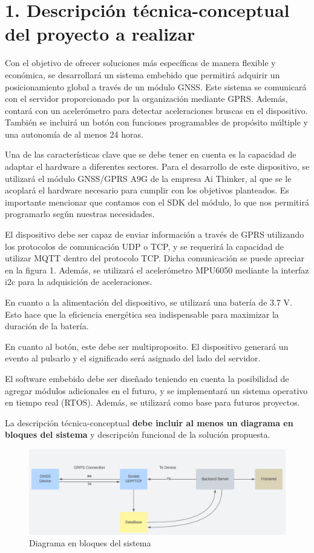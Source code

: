 \documentclass[
11pt, %
codirector, %
]{charter}
\begin{document}
\section{1. Descripción técnica-conceptual del proyecto a realizar}
\label{sec:descripcion}


Con el objetivo de ofrecer soluciones más específicas de manera flexible y económica, se desarrollará un sistema embebido que permitirá adquirir un posicionamiento global a través de un módulo GNSS. Este sistema se comunicará con el servidor proporcionado por la organización mediante GPRS. Además, contará con un acelerómetro para detectar aceleraciones bruscas en el dispositivo. También se incluirá un botón con funciones programables de propósito múltiple y una autonomía de al menos 24 horas.

Una de las características clave que se debe tener en cuenta es la capacidad de adaptar el hardware a diferentes sectores. Para el desarrollo de este dispositivo, se utilizará el módulo GNSS/GPRS A9G de la empresa Ai Thinker, al que se le acoplará el hardware necesario para cumplir con los objetivos planteados. Es importante mencionar que contamos con el SDK del módulo, lo que nos permitirá programarlo según nuestras necesidades.

El dispositivo debe ser capaz de enviar información a través de GPRS utilizando los protocolos de comunicación UDP o TCP, y se requerirá la capacidad de utilizar MQTT dentro del protocolo TCP. Dicha comunicación se puede apreciar en la figura 1. Además, se utilizará el acelerómetro MPU6050 mediante la interfaz i2c para la adquisición de aceleraciones.

En cuanto a la alimentación del dispositivo, se utilizará una batería de 3.7 V. Esto hace que la eficiencia energética sea indispensable para maximizar la duración de la batería.

En cuanto al botón, este debe ser multiproposito. El dispositivo generará un evento al pulsarlo y el significado será asignado del lado del servidor.

El software embebido debe ser diseñado teniendo en cuenta la posibilidad de agregar módulos adicionales en el futuro, y se implementará un sistema operativo en tiempo real (RTOS). Además, se utilizará como base para futuros proyectos.


La descripción técnica-conceptual \textbf{debe incluir al menos un diagrama en bloques del sistema} y descripción funcional de la solución propuesta.

\begin{figure}[htpb]
\centering 
\includegraphics[width=1\textwidth]{./Figuras/diagBloque.png}
\caption{Diagrama en bloques del sistema}
\label{fig:diagBloques}
\end{figure}
\end{document}
